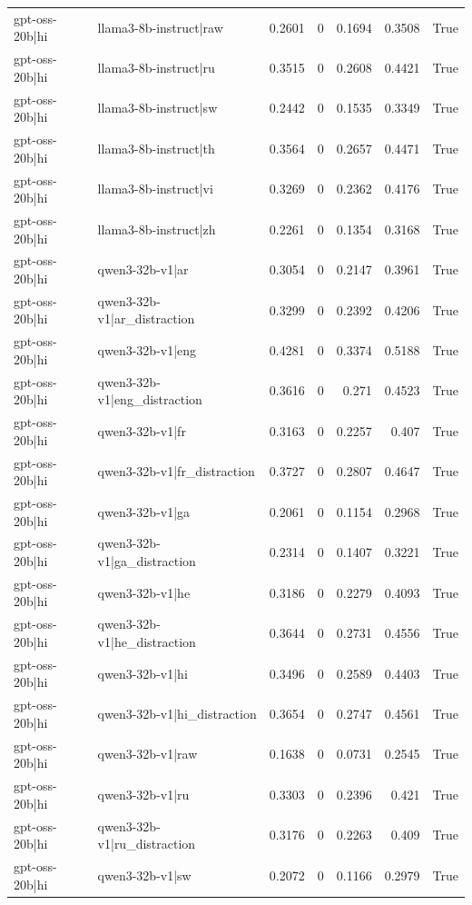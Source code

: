 \begin{table}
\begin{tabular}{l l r r r r l}
gpt-oss-20b|hi & llama3-8b-instruct|raw & 0.2601 & 0 & 0.1694 & 0.3508 & True \\
gpt-oss-20b|hi & llama3-8b-instruct|ru & 0.3515 & 0 & 0.2608 & 0.4421 & True \\
gpt-oss-20b|hi & llama3-8b-instruct|sw & 0.2442 & 0 & 0.1535 & 0.3349 & True \\
gpt-oss-20b|hi & llama3-8b-instruct|th & 0.3564 & 0 & 0.2657 & 0.4471 & True \\
gpt-oss-20b|hi & llama3-8b-instruct|vi & 0.3269 & 0 & 0.2362 & 0.4176 & True \\
gpt-oss-20b|hi & llama3-8b-instruct|zh & 0.2261 & 0 & 0.1354 & 0.3168 & True \\
gpt-oss-20b|hi & qwen3-32b-v1|ar & 0.3054 & 0 & 0.2147 & 0.3961 & True \\
gpt-oss-20b|hi & qwen3-32b-v1|ar_distraction & 0.3299 & 0 & 0.2392 & 0.4206 & True \\
gpt-oss-20b|hi & qwen3-32b-v1|eng & 0.4281 & 0 & 0.3374 & 0.5188 & True \\
gpt-oss-20b|hi & qwen3-32b-v1|eng_distraction & 0.3616 & 0 & 0.271 & 0.4523 & True \\
gpt-oss-20b|hi & qwen3-32b-v1|fr & 0.3163 & 0 & 0.2257 & 0.407 & True \\
gpt-oss-20b|hi & qwen3-32b-v1|fr_distraction & 0.3727 & 0 & 0.2807 & 0.4647 & True \\
gpt-oss-20b|hi & qwen3-32b-v1|ga & 0.2061 & 0 & 0.1154 & 0.2968 & True \\
gpt-oss-20b|hi & qwen3-32b-v1|ga_distraction & 0.2314 & 0 & 0.1407 & 0.3221 & True \\
gpt-oss-20b|hi & qwen3-32b-v1|he & 0.3186 & 0 & 0.2279 & 0.4093 & True \\
gpt-oss-20b|hi & qwen3-32b-v1|he_distraction & 0.3644 & 0 & 0.2731 & 0.4556 & True \\
gpt-oss-20b|hi & qwen3-32b-v1|hi & 0.3496 & 0 & 0.2589 & 0.4403 & True \\
gpt-oss-20b|hi & qwen3-32b-v1|hi_distraction & 0.3654 & 0 & 0.2747 & 0.4561 & True \\
gpt-oss-20b|hi & qwen3-32b-v1|raw & 0.1638 & 0 & 0.0731 & 0.2545 & True \\
gpt-oss-20b|hi & qwen3-32b-v1|ru & 0.3303 & 0 & 0.2396 & 0.421 & True \\
gpt-oss-20b|hi & qwen3-32b-v1|ru_distraction & 0.3176 & 0 & 0.2263 & 0.409 & True \\
gpt-oss-20b|hi & qwen3-32b-v1|sw & 0.2072 & 0 & 0.1166 & 0.2979 & True \\

\end{tabular}
\end{table}
